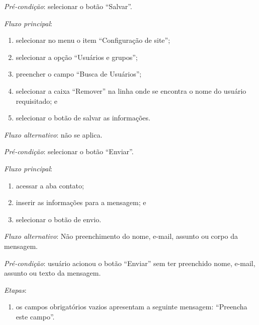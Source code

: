 \vspace{0.7cm}

\noindent \textit{Pré-condição}: selecionar o botão ``Salvar''.

\noindent \textit{Fluxo principal}:

\begin{enumerate}
    \item selecionar no menu o item ``Configuração de site'';
    \item selecionar a opção ``Usuários e grupos'';
    \item preencher o campo ``Busca de Usuários'';
    \item selecionar a caixa ``Remover'' na linha onde se encontra o nome do usuário requisitado; e
    \item selecionar o botão de salvar as informações.
\end{enumerate}

\noindent \textit{Fluxo alternativo}: não se aplica.


\vspace{0.7cm}

\noindent \textit{Pré-condição}: selecionar o botão ``Enviar''.

\noindent \textit{Fluxo principal}:

\begin{enumerate}
    \item acessar a aba contato;
    \item inserir as informações para a mensagem; e
    \item selecionar o botão de envio.
\end{enumerate}

\noindent \textit{Fluxo alternativo}: Não preenchimento do nome, e-mail, assunto ou corpo da mensagem.

\noindent \textit{Pré-condição}: usuário acionou o botão ``Enviar'' sem ter preenchido nome, e-mail, assunto ou texto da mensagem.

\noindent \textit{Etapas}:

\begin{enumerate}
    \item os campos obrigatórios vazios apresentam a seguinte mensagem: ``Preencha este campo''.
\end{enumerate}


